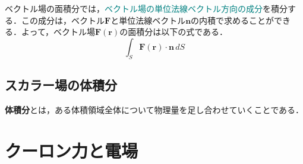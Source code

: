 ベクトル場の面積分では，\textcolor{teal}{ベクトル場の単位法線ベクトル方向の成分}を積分する．この成分は，ベクトル$\bm{F}$と単位法線ベクトル$\bm{n}$の内積で求めることができる．よって，ベクトル場$\bm{F}(\bm{r})$の面積分は以下の式である．
\begin{equation}
	\int_{S} \bm{F}(\bm{r}) \cdot \bm{n} \, dS
\end{equation}



\subsection{スカラー場の体積分}

\textbf{体積分}とは，ある体積領域全体について物理量を足し合わせていくことである．



\section{クーロン力と電場}






